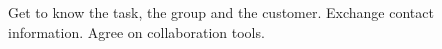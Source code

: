 \nextItem Get to know the task, the group and the customer.
\nextItem Exchange contact information.
\nextItem Agree on collaboration tools.

